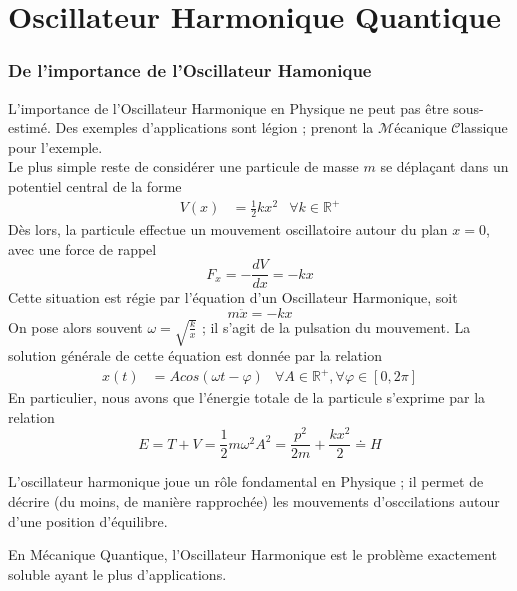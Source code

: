 \documentclass[../notesdecours.tex]{subfiles}
\begin{document}
\part{Oscillateur Harmonique Quantique}
\section{De l'importance de l'Oscillateur Hamonique}
L'importance de l'Oscillateur Harmonique en Physique ne peut pas être sous-estimé. Des exemples d'applications sont légion ; prenont la $\mathcal{M}$écanique $\mathcal{C}$lassique pour l'exemple.\\

Le plus simple reste de considérer une particule de masse $m$ se déplaçant dans un potentiel central de la forme 
\begin{align}
    V(x) &= \frac{1}{2}kx^2     &\forall k\in\mathbb{R^+}
\end{align}
Dès lors, la particule effectue un mouvement oscillatoire autour du plan $x = 0$, avec une force de rappel 
\begin{equation}
    F_x = -\frac{dV}{dx} = -kx
\end{equation}
Cette situation est régie par l'équation d'un Oscillateur Harmonique, soit
\begin{equation}
    m\ddot{x} = -kx
\end{equation}
On pose alors souvent $\omega = \sqrt{\frac{k}{x}}$ ; il s'agit de la pulsation du mouvement. La solution générale de cette équation est donnée par la relation 
\begin{align}
    x(t) &= Acos \left(\omega t-\varphi\right)       &\forall A\in\mathbb{R}^+,\forall\varphi\in [0,2\pi]
\end{align}
En particulier, nous avons que l'énergie totale de la particule s'exprime par la relation
\begin{equation}
    E = T+V = \frac{1}{2}m\omega^2A^2 = \frac{p^2}{2m}+\frac{kx^2}{2} \doteq H
\end{equation}

\begin{remark}
    L'oscillateur harmonique joue un rôle fondamental en Physique ; il permet de décrire (du moins, de manière rapprochée) les mouvements d'osccilations autour d'une position d'équilibre.
\end{remark}

\begin{remark}
    En Mécanique Quantique, l'Oscillateur Harmonique est le problème exactement soluble ayant le plus d'applications.
\end{remark}
\end{document}
